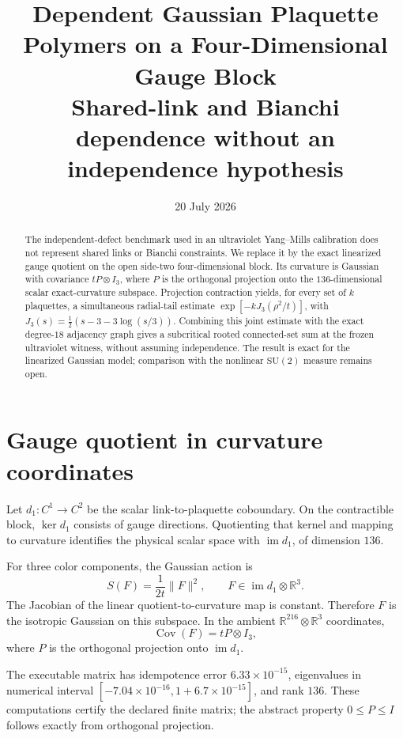 \documentclass[11pt]{article}
\title{Dependent Gaussian Plaquette Polymers on a Four-Dimensional Gauge Block\\
\large Shared-link and Bianchi dependence without an independence hypothesis}
\author{}
\date{20 July 2026}
\begin{document}
\maketitle

\begin{abstract}
The independent-defect benchmark used in an ultraviolet Yang--Mills
calibration does not represent shared links or Bianchi constraints.  We replace
it by the exact linearized gauge quotient on the open side-two four-dimensional
block.  Its curvature is Gaussian with covariance $tP\otimes I_3$, where $P$
is the orthogonal projection onto the $136$-dimensional scalar exact-curvature
subspace.  Projection contraction yields, for every set of $k$ plaquettes, a
simultaneous radial-tail estimate $\exp[-kJ_3(\rho^2/t)]$, with
$J_3(s)=\tfrac12(s-3-3\log(s/3))$.  Combining this joint estimate with the
exact degree-$18$ adjacency graph gives a subcritical rooted connected-set sum
at the frozen ultraviolet witness, without assuming independence.  The result
is exact for the linearized Gaussian model; comparison with the nonlinear
$\mathrm{SU}(2)$ measure remains open.
\end{abstract}

\tableofcontents

\section{Gauge quotient in curvature coordinates}

Let $d_1:C^1\to C^2$ be the scalar link-to-plaquette coboundary.  On the
contractible block, $\ker d_1$ consists of gauge directions.  Quotienting that
kernel and mapping to curvature identifies the physical scalar space with
$\operatorname{im}d_1$, of dimension $136$.

For three color components, the Gaussian action is
\[
 S(F)=\frac1{2t}\|F\|^2,
 \qquad F\in\operatorname{im}d_1\otimes\mathbb R^3.
\]
The Jacobian of the linear quotient-to-curvature map is constant.  Therefore
$F$ is the isotropic Gaussian on this subspace.  In the ambient
$\mathbb R^{216}\otimes\mathbb R^3$ coordinates,
\begin{equation}
 \operatorname{Cov}(F)=tP\otimes I_3,
 \label{eq:cov}
\end{equation}
where $P$ is the orthogonal projection onto $\operatorname{im}d_1$.

The executable matrix has idempotence error $6.33\times10^{-15}$, eigenvalues
in numerical interval $[-7.04\times10^{-16},1+6.7\times10^{-15}]$, and rank
$136$.  These computations certify the declared finite matrix; the abstract
property $0\leq P\leq I$ follows exactly from orthogonal projection.
\end{document}
